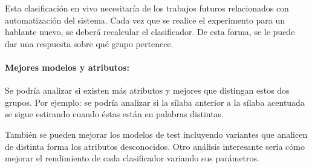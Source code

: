 Esta clasificación en vivo necesitaría de los trabajos futuros relacionados con automatización del sistema. Cada vez que se realice el experimento para un hablante nuevo, se deberá recalcular el clasificador. De esta forma, se le puede dar una respuesta sobre qué grupo pertenece.

\paragraph*{Mejores modelos y atributos:} Se podría analizar si existen más atributos y mejores que distingan estos dos grupos. Por ejemplo: se podría analizar si la sílaba anterior a la sílaba acentuada se sigue estirando cuando éstas están en palabras distintas.

También se pueden mejorar los modelos de test incluyendo variantes que analicen de distinta forma los atributos desconocidos. Otro análisis interesante sería cómo mejorar el rendimiento de cada clasificador variando sus parámetros.